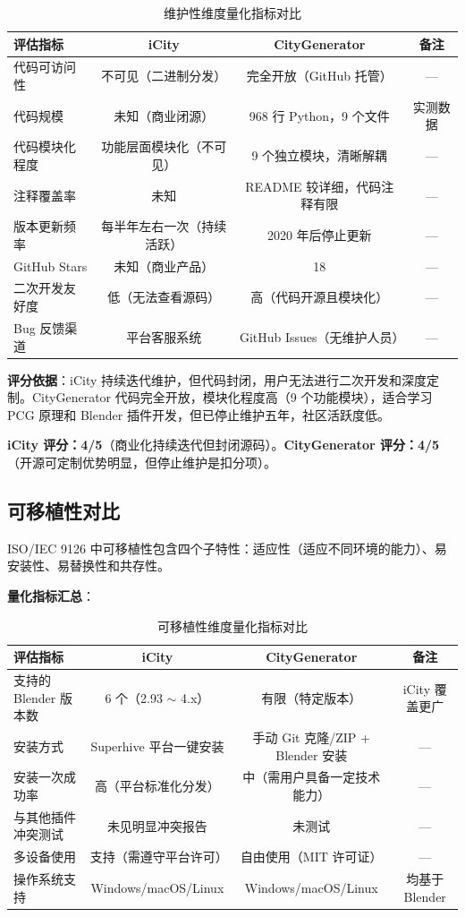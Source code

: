 \documentclass[UTF8,a4paper,10pt]{ctexart}
\begin{document}
\begin{table}[htbp]
\centering
\caption{维护性维度量化指标对比}
\label{tab:maintainability_quant}
\begin{tabular}{p{3.5cm}ccc}
\toprule
\textbf{评估指标} & \textbf{iCity} & \textbf{CityGenerator} & \textbf{备注} \\
\midrule
代码可访问性 & 不可见（二进制分发） & 完全开放（GitHub 托管） & — \\
代码规模 & 未知（商业闭源） & 968 行 Python，9 个文件 & 实测数据 \\
代码模块化程度 & 功能层面模块化（不可见） & 9 个独立模块，清晰解耦 & — \\
注释覆盖率 & 未知 & README 较详细，代码注释有限 & — \\
版本更新频率 & 每半年左右一次（持续活跃） & 2020 年后停止更新 & — \\
GitHub Stars & 未知（商业产品） & 18 & — \\
二次开发友好度 & 低（无法查看源码） & 高（代码开源且模块化） & — \\
Bug 反馈渠道 & 平台客服系统 & GitHub Issues（无维护人员） & — \\
\bottomrule
\end{tabular}
\end{table}

\textbf{评分依据}：iCity 持续迭代维护，但代码封闭，用户无法进行二次开发和深度定制。CityGenerator 代码完全开放，模块化程度高（9 个功能模块），适合学习 PCG 原理和 Blender 插件开发，但已停止维护五年，社区活跃度低。

\textbf{iCity 评分：4/5}（商业化持续迭代但封闭源码）。\textbf{CityGenerator 评分：4/5}（开源可定制优势明显，但停止维护是扣分项）。

\subsection{可移植性对比}

ISO/IEC 9126 中可移植性包含四个子特性：适应性（适应不同环境的能力）、易安装性、易替换性和共存性。

\textbf{量化指标汇总}：

\begin{table}[htbp]
\centering
\caption{可移植性维度量化指标对比}
\label{tab:portability_quant}
\begin{tabular}{p{3.5cm}ccc}
\toprule
\textbf{评估指标} & \textbf{iCity} & \textbf{CityGenerator} & \textbf{备注} \\
\midrule
支持的 Blender 版本数 & 6 个（2.93 $\sim$ 4.x） & 有限（特定版本） & iCity 覆盖更广 \\
安装方式 & Superhive 平台一键安装 & 手动 Git 克隆/ZIP + Blender 安装 & — \\
安装一次成功率 & 高（平台标准化分发） & 中（需用户具备一定技术能力） & — \\
与其他插件冲突测试 & 未见明显冲突报告 & 未测试 & — \\
多设备使用 & 支持（需遵守平台许可） & 自由使用（MIT 许可证） & — \\
操作系统支持 & Windows/macOS/Linux & Windows/macOS/Linux & 均基于 Blender \\
\bottomrule
\end{tabular}
\end{table}
\end{document}
